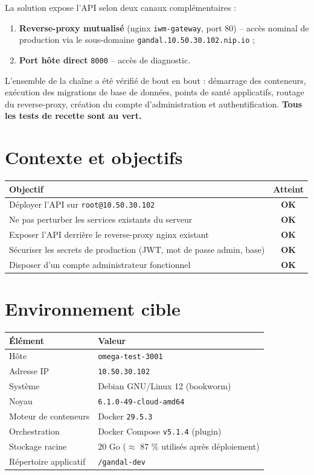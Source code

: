 \documentclass[11pt,a4paper]{article}
\newcommand{\code}[1]{\texttt{\small #1}}
\newcommand{\ok}{\textcolor{ok}{\textbf{OK}}}
\begin{document}
La solution expose l'API selon deux canaux complémentaires :
\begin{enumerate}
  \item \textbf{Reverse-proxy mutualisé} (nginx \code{iwm-gateway}, port 80) -- accès
        nominal de production via le sous-domaine \code{gandal.10.50.30.102.nip.io} ;
  \item \textbf{Port hôte direct} \code{8000} -- accès de diagnostic.
\end{enumerate}

L'ensemble de la chaîne a été vérifié de bout en bout : démarrage des conteneurs,
exécution des migrations de base de données, points de santé applicatifs, routage du
reverse-proxy, création du compte d'administration et authentification.
\textbf{Tous les tests de recette sont au vert.}

\section{Contexte et objectifs}

\begin{tabularx}{\linewidth}{@{}X c@{}}
\toprule
\textbf{Objectif} & \textbf{Atteint} \\
\midrule
Déployer l'API sur \code{root@10.50.30.102} & \ok \\
Ne pas perturber les services existants du serveur & \ok \\
Exposer l'API derrière le reverse-proxy nginx existant & \ok \\
Sécuriser les secrets de production (JWT, mot de passe admin, base) & \ok \\
Disposer d'un compte administrateur fonctionnel & \ok \\
\bottomrule
\end{tabularx}

\section{Environnement cible}

\begin{tabularx}{\linewidth}{@{}l X@{}}
\toprule
\textbf{Élément} & \textbf{Valeur} \\
\midrule
Hôte & \code{omega-test-3001} \\
Adresse IP & \code{10.50.30.102} \\
Système & Debian GNU/Linux 12 (bookworm) \\
Noyau & \code{6.1.0-49-cloud-amd64} \\
Moteur de conteneurs & Docker \code{29.5.3} \\
Orchestration & Docker Compose \code{v5.1.4} (plugin) \\
Stockage racine & 20 Go ($\approx$ 87 \% utilisés après déploiement) \\
Répertoire applicatif & \code{/gandal-dev} \\
\bottomrule
\end{tabularx}
\end{document}
